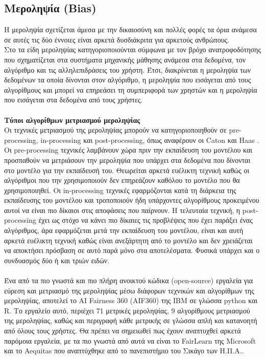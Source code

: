 \subsection{Μεροληψία (Bias)} \label{seq:bias}
\noindent Η μεροληψία σχετίζεται άμεσα με την δικαιοσύνη και πολλές φορές τα όρια ανάμεσα σε αυτές τις δύο έννοιες είναι αρκετά δυσδιάκριτα για αρκετούς ανθρώπους.\\
Στο \cite{mehrabiSurveyBiasFairness2021} τα είδη μεροληψίας κατηγοριοποιούνται σύμφωνα με τον βρόχο ανατροφοδότησης που σχηματίζεται στα συστήματα μηχανικής μάθησης ανάμεσα στα δεδομένα, τον αλγόριθμο και τις αλληλεπιδράσεις του χρήστη. Έτσι, διακρίνεται η μεροληψία των δεδομένων τα οποία δίνονται στον αλγόριθμο, η μεροληψία που εισάγεται από τους αλγορίθμους και μπορεί να επηρεάσει τη συμπεριφορά των χρηστών και η μεροληψία που εισάγεται στα δεδομένα από τους χρήστες.
\\\\
\textbf{Τύποι αλγορίθμων μετριασμού μεροληψίας}\\
Οι τεχνικές μετριασμού της μεροληψίας μπορούν να κατηγοριοποιηθούν σε pre-processing, in-processing και post-processing, όπως αναφέρουν οι Caton και Haas \cite{catonFairnessMachineLearning2020}. Οι pre-processing τεχνικές λαμβάνουν χώρα πριν την εκπαίδευση του μοντέλου και προσπαθούν να μετριάσουν την μεροληψία που υπάρχει στα δεδομένα που δίνονται στο μοντέλο για την εκπαίδευσή του. Θεωρείται αρκετά ευέλικτη τεχνική καθώς οι αλγόριθμοι που την χρησιμοποιούν δεν επηρεάζουν καθόλου το μοντέλο που θα χρησιμοποιηθεί. Οι in-processing τεχνικές εφαρμόζονται κατά τη διάρκεια της εκπαίδευσης του μοντέλου και τροποποιούν ήδη υπάρχοντες αλγορίθμους προκειμένου αυτοί να είναι πιο δίκαιοι στις αποφάσεις που παίρνουν. Η τελευταία τεχνική, η post-processing έχει ως στόχο να κάνει πιο δίκαιες τις προβλέψεις που έχει παράξει ένας αλγόριθμος, άρα εφαρμόζεται μετά την εκπαίδευση του μοντέλου, είναι και αυτή αρκετά ευέλικτη τεχνική καθώς είναι ανεξάρτητη από το μοντέλο και δεν χρειάζεται να αποκτήσει πρόσβαση σε αυτό παρά μόνο στα αποτελέσματα. Φυσικά υπάρχει και ο συνδυασμός δύο ή και τριών ειδών.\\\\
Ένα από τα πιο γνωστά και πιο πλήρη ανοικτού κώδικα (open-source) εργαλεία για εύρεση και μετριασμό της μεροληψίας μέσω διάφορων τεχνικών και αλγορίθμων της μεροληψίας, αποτελεί το AI Fairness 360 (AIF360) της IBM \cite{bellamyAIFairness3602018} σε γλώσσα python και R. Το εργαλείο αυτό, περιέχει 71 μετρικές μεροληψίας, 9 αλγορίθμους μετριασμού της μεροληψίας, καθώς και περιγραφή κάθε μετρικής σε γλώσσα απλή και κατανοητή από όλους τους χρήστες. Θα πρέπει να σημειωθεί πως έχουν αναπτυχθεί αρκετά παρόμοια εργαλεία, με τα πιο γνωστά από αυτά να είναι το FairLearn \cite{bird2020fairlearn} της Microsoft και το Aequitas \cite{saleiroAequitasBiasFairness2019} που αναπτύχθηκε από το πανεπιστήμιο του Σικάγο των Η.Π.Α..\\
